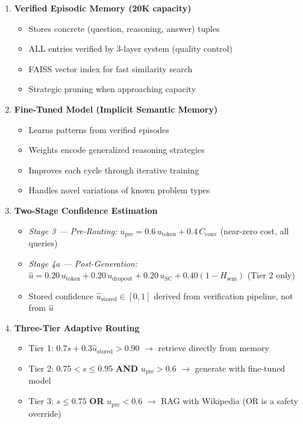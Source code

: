 \documentclass[12pt,a4paper]{article}
\theoremstyle{definition}
\newcommand{\upre}{u_{\text{pre}}}
\newcommand{\uhat}{\hat{u}}
\newcommand{\ustored}{\hat{u}_{\text{stored}}}
\newcommand{\Cconv}{C_{\text{conv}}}
\begin{document}
\begin{enumerate}
    \item \textbf{Verified Episodic Memory (20K capacity)}
    \begin{itemize}
        \item Stores concrete (question, reasoning, answer) tuples
        \item ALL entries verified by 3-layer system (quality control)
        \item FAISS vector index for fast similarity search
        \item Strategic pruning when approaching capacity
    \end{itemize}
    
    \item \textbf{Fine-Tuned Model (Implicit Semantic Memory)}
    \begin{itemize}
        \item Learns patterns from verified episodes
        \item Weights encode generalized reasoning strategies
        \item Improves each cycle through iterative training
        \item Handles novel variations of known problem types
    \end{itemize}
    
    \item \textbf{Two-Stage Confidence Estimation}
    \begin{itemize}
        \item \textit{Stage 3 — Pre-Routing:} $\upre = 0.6\,u_{\text{token}} + 0.4\,\Cconv$ (near-zero cost, all queries)
        \item \textit{Stage 4a — Post-Generation:} $\uhat = 0.20\,u_{\text{token}} + 0.20\,u_{\text{dropout}} + 0.20\,u_{\text{SC}} + 0.40(1{-}H_{\text{sem}})$ (Tier 2 only)
        \item Stored confidence $\ustored \in [0,1]$ derived from verification pipeline, not from $\uhat$
    \end{itemize}

    \item \textbf{Three-Tier Adaptive Routing}
    \begin{itemize}
        \item Tier 1: $0.7s + 0.3\ustored > 0.90$ $\rightarrow$ retrieve directly from memory
        \item Tier 2: $0.75 < s \leq 0.95$ \textbf{AND} $\upre > 0.6$ $\rightarrow$ generate with fine-tuned model
        \item Tier 3: $s \leq 0.75$ \textbf{OR} $\upre < 0.6$ $\rightarrow$ RAG with Wikipedia (OR is a safety override)
    \end{itemize}
    

\end{enumerate}
\end{document}
